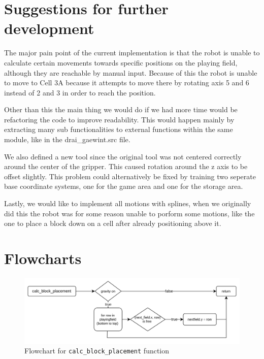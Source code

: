 \documentclass{article}
\begin{document}
    \newpage
    \section{Suggestions for further development}
        The major pain point of the current implementation is that the robot is unable to calculate certain movements towards specific positions on the playing field, although they are reachable by manual input. Because of this the robot is unable to move to Cell 3A because it attempts to move there by rotating axis 5 and 6 instead of 2 and 3 in order to reach the position. 

        Other than this the main thing we would do if we had more time would be refactoring the code to  improve readability. This would happen mainly by extracting many sub functionalities to external functions within the same module, like in the drai\_gaewint.src file. 

        We also defined a new tool since the original tool was not centered correctly around the center of the gripper. This caused rotation around the z axis to be offset slightly. This problem could alternatively be fixed by training two seperate base coordinate systems, one for the game area and one for the storage area.
        
        Lastly, we would like to implement all motions with splines, when we originally did this the robot was for some reason unable to porform some motions, like the one to place a block down on a cell after already positioning above it. 

    \newpage
    \section{Flowcharts}
        \begin{figure}[htbp]
            \centering
            \includegraphics[width=\textwidth]{../media/calc_block_placement.png}
            \caption{Flowchart for \texttt{calc\_block\_placement} function}\label{fig:calc_block_placement}
        \end{figure}
\end{document}
